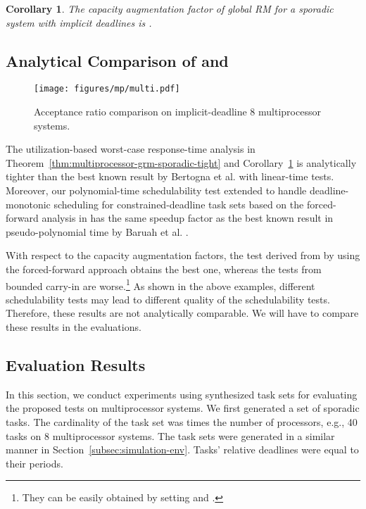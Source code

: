 \documentclass[10pt,conference]{IEEEtran}
\newcommand{\frameworkkq}[1]{}
\newcommand{\frameworkku}[1]{}
\newtheorem{corollary}{Corollary}
\begin{document}
\begin{corollary}
  \label{col:grm-tight}
  The capacity augmentation factor of global RM for a sporadic system
  with implicit deadlines is .
\end{corollary}


\subsection{Analytical Comparison of \frameworkkq{} and \frameworkku{}}

\begin{figure*}[t]
  \centering
  \texttt{[image: figures/mp/multi.pdf]}
  \caption{Acceptance ratio comparison on implicit-deadline 8 multiprocessor systems.}
  \label{fig:mul-2}
\end{figure*}

The utilization-based worst-case response-time analysis in
Theorem~\ref{thm:multiprocessor-grm-sporadic-tight} and
Corollary~\ref{col:grm-tight} is analytically tighter than the best
known result by Bertogna et
al. \cite{bertogna2006new} with linear-time tests. Moreover, our
polynomial-time schedulability test extended to handle
deadline-monotonic scheduling for constrained-deadline task sets based
on the forced-forward analysis in
\cite{DBLP:journals/corr/abs-kRTA} has the same speedup factor as the
best known result in pseudo-polynomial time by Baruah et
al. \cite{DBLP:journals/rts/BaruahBMS10}.

With respect to the capacity augmentation factors, the test derived
from \frameworkkq{} by using the forced-forward approach obtains the
best one, whereas the tests from bounded carry-in are worse.\footnote{They can be easily obtained by setting  and .}
As shown in the above examples, different schedulability tests may
lead to different quality of the schedulability tests. Therefore,
these results are not analytically comparable. We will have to compare
these results in the evaluations.

\subsection{Evaluation Results}
In this section, we conduct experiments using synthesized task sets for evaluating the proposed tests on multiprocessor systems.
We first generated a set of sporadic tasks. The cardinality of the task set was  times the number of processors, e.g., 40 tasks on 8 multiprocessor systems.
The task sets were generated in a similar manner in Section~\ref{subsec:simulation-env}. Tasks' relative deadlines were equal to their periods.
\end{document}
